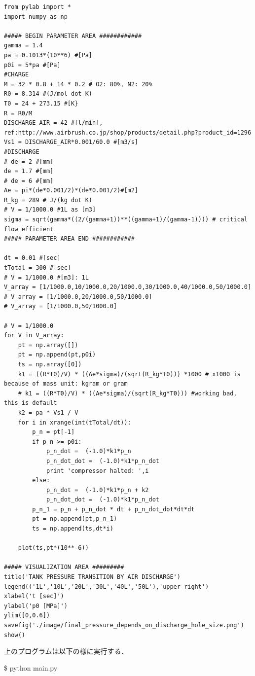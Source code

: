 \documentclass{jsarticle}
\begin{document}
\begin{lstlisting}[caption=タンク内全圧の計算(main.py),label=tank_total_pressure]
from pylab import *
import numpy as np

##### BEGIN PARAMETER AREA ############
gamma = 1.4
pa = 0.1013*(10**6) #[Pa]
p0i = 5*pa #[Pa]
#CHARGE
M = 32 * 0.8 + 14 * 0.2 # O2: 80%, N2: 20%
R0 = 8.314 #(J/mol dot K)
T0 = 24 + 273.15 #[K}
R = R0/M
DISCHARGE_AIR = 42 #[l/min], ref:http://www.airbrush.co.jp/shop/products/detail.php?product_id=1296
Vs1 = DISCHARGE_AIR*0.001/60.0 #[m3/s]
#DISCHARGE
# de = 2 #[mm]
de = 1.7 #[mm]
# de = 6 #[mm]
Ae = pi*(de*0.001/2)*(de*0.001/2)#[m2]
R_kg = 289 # J/(kg dot K)
# V = 1/1000.0 #1L as [m3]
sigma = sqrt(gamma*((2/(gamma+1))**((gamma+1)/(gamma-1)))) # critical flow efficient
##### PARAMETER AREA END ############

dt = 0.01 #[sec]
tTotal = 300 #[sec]
# V = 1/1000.0 #[m3]: 1L
V_array = [1/1000.0,10/1000.0,20/1000.0,30/1000.0,40/1000.0,50/1000.0]
# V_array = [1/1000.0,20/1000.0,50/1000.0]
# V_array = [1/1000.0,50/1000.0]

# V = 1/1000.0
for V in V_array:
    pt = np.array([])
    pt = np.append(pt,p0i) 
    ts = np.array([0])
    k1 = ((R*T0)/V) * ((Ae*sigma)/(sqrt(R_kg*T0))) *1000 # x1000 is because of mass unit: kgram or gram
    # k1 = ((R*T0)/V) * ((Ae*sigma)/(sqrt(R_kg*T0))) #working bad, this is default 
    k2 = pa * Vs1 / V
    for i in xrange(int(tTotal/dt)):
        p_n = pt[-1]
        if p_n >= p0i:
            p_n_dot =  (-1.0)*k1*p_n
            p_n_dot_dot =  (-1.0)*k1*p_n_dot
            print 'compressor halted: ',i
        else:
            p_n_dot =  (-1.0)*k1*p_n + k2
            p_n_dot_dot =  (-1.0)*k1*p_n_dot
        p_n_1 = p_n + p_n_dot * dt + p_n_dot_dot*dt*dt
        pt = np.append(pt,p_n_1)
        ts = np.append(ts,dt*i)
    
    plot(ts,pt*(10**-6))

##### VISUALIZATION AREA #########
title('TANK PRESSURE TRANSITION BY AIR DISCHARGE')
legend(('1L','10L','20L','30L','40L','50L'),'upper right')
xlabel('t [sec]')
ylabel('p0 [MPa]')
ylim([0,0.6])
savefig('./image/final_pressure_depends_on_discharge_hole_size.png')
show()
\end{lstlisting}
上のプログラムは以下の様に実行する．
\begin{screen}
\$ python main.py
\end{screen}
\end{document}
